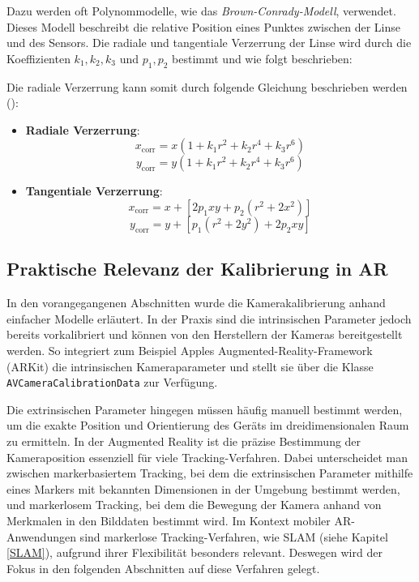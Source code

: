 Dazu werden oft Polynommodelle, wie das \emph{Brown-Conrady-Modell}, verwendet. Dieses Modell beschreibt die relative Position eines Punktes zwischen der Linse und des Sensors. Die radiale und tangentiale Verzerrung der Linse wird durch die Koeffizienten \( k_1, k_2, k_3 \) und \( p_1, p_2 \) bestimmt \cite{brown1966distortion} und wie folgt beschrieben:

Die radiale Verzerrung kann somit durch folgende Gleichung beschrieben werden (\cite{mw2024calibration, szeliski2022computerVision}):
\begin{itemize}
    \item \textbf{Radiale Verzerrung}:
    \[ x_{\text{corr}} = x \left( 1 + k_1 r^2 + k_2 r^4 + k_3 r^6 \right) \]
    \[ y_{\text{corr}} = y \left( 1 + k_1 r^2 + k_2 r^4 + k_3 r^6 \right) \]
    \item \textbf{Tangentiale Verzerrung}:
    \[ x_{\text{corr}} = x + [2p_1xy + p_2(r^2 + 2x^2)] \]
    \[ y_{\text{corr}} = y + [p_1(r^2 + 2y^2) + 2p_2xy] \]
\end{itemize}

\subsection{Praktische Relevanz der Kalibrierung in AR}

In den vorangegangenen Abschnitten wurde die Kamerakalibrierung anhand einfacher Modelle erläutert. In der Praxis sind die intrinsischen Parameter jedoch bereits vorkalibriert und können von den Herstellern der Kameras bereitgestellt werden. So integriert zum Beispiel Apples Augmented-Reality-Framework (ARKit) die intrinsischen Kameraparameter und stellt sie über die Klasse \texttt{AVCameraCalibrationData} zur Verfügung. \cite{appledevdoc}

Die extrinsischen Parameter hingegen müssen häufig manuell bestimmt werden, um die exakte Position und Orientierung des Geräts im dreidimensionalen Raum zu ermitteln. In der Augmented Reality ist die präzise Bestimmung der Kameraposition essenziell für viele Tracking-Verfahren. Dabei unterscheidet man zwischen markerbasiertem Tracking, bei dem die extrinsischen Parameter mithilfe eines Markers mit bekannten Dimensionen in der Umgebung bestimmt werden, und markerlosem Tracking, bei dem die Bewegung der Kamera anhand von Merkmalen in den Bilddaten bestimmt wird. Im Kontext mobiler AR-Anwendungen sind markerlose Tracking-Verfahren, wie SLAM (siehe Kapitel \ref{SLAM}), aufgrund ihrer Flexibilität besonders relevant. Deswegen wird der Fokus in den folgenden Abschnitten auf diese Verfahren gelegt. \cite{doerner2022virtual, alam2024calibration}

